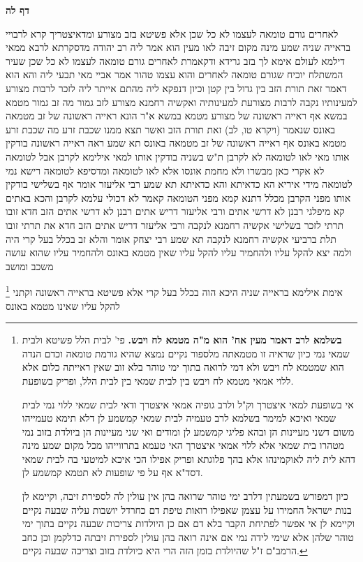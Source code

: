 \documentclass[12pt, openany]{book}
\newcommand{\sethebfont}{
\fontsize{10.5pt}{21.0pt} \selectfont
}
\newcommand{\twocol}[1]{
	{\sethebfont \begin{multicols}{2}
			#1
	\end{multicols}}	
}
\newcommand{\sectname}{}
\newcommand{\newsection}[1]{
	\addcontentsline{toc}{section}{#1}
	\renewcommand{\sectname}{#1}	
	\vspace{-\baselineskip}
	\begin{center}
		\textbf{%
\fontsize{16pt}{16pt}\selectfont
			#1}
	\end{center}
	\vspace{-\baselineskip}
	\nopagebreak
}
\newcommand{\footnotecomment}[1]{
	\renewcommand\thefootnote{}
	\footnote{#1}}
\newcommand{\commenta}[1]{\footnotecomment{#1}}
\begin{document}
\newsection{דף לה}
\twocol{לאחרים גורם טומאה לעצמו לא כל שכן אלא פשיטא בזב מצורע
ומדאיצטריך קרא לרבויי בראייה שניה שמע מינה מקום זיבה לאו מעין הוא 
אמר ליה רב יהודה מדסקרתא לרבא ממאי דילמא לעולם אימא לך בזב גרידא ודקאמרת לאחרים גורם טומאה לעצמו לא כל שכן שעיר המשתלח יוכיח שגורם טומאה לאחרים והוא עצמו טהור 
אמר אביי מאי תבעי ליה והא הוא דאמר זאת תורת הזב בין גדול בין קטן וכיון דנפקא ליה מהתם אייתר ליה לזכר לרבות מצורע למעינותיו נקבה לרבות מצורעת למעינותיה
ואקשיה רחמנא מצורע לזב גמור מה זב גמור מטמא במשא אף ראייה ראשונה של מצורע מטמא במשא 
א"ר הונא ראייה ראשונה של זב מטמאה באונס שנאמר (ויקרא טו, לב) זאת תורת הזב ואשר תצא ממנו שכבת זרע מה שכבת זרע מטמא באונס אף ראייה ראשונה של זב מטמאה באונס 
תא שמע ראה ראייה ראשונה בודקין אותו מאי לאו לטומאה לא לקרבן 
ת"ש בשניה בודקין אותו למאי אילימא לקרבן אבל לטומאה לא אקרי כאן מבשרו ולא מחמת אונסו אלא לאו לטומאה ומדסיפא לטומאה רישא נמי לטומאה 
מידי איריא הא כדאיתא והא כדאיתא 
תא שמע רבי אליעזר אומר אף בשלישי בודקין אותו מפני הקרבן מכלל דתנא קמא מפני הטומאה קאמר 
לא דכולי עלמא לקרבן והכא באתים קא מיפלגי רבנן לא דרשי אתים ורבי אליעזר דריש אתים 
רבנן לא דרשי אתים הזב חדא זובו תרתי לזכר בשלישי אקשיה רחמנא לנקבה 
ורבי אליעזר דריש אתים הזב חדא את תרתי זובו תלת ברביעי אקשיה רחמנא לנקבה 
תא שמע רבי יצחק אומר והלא זב בכלל בעל קרי היה ולמה יצא להקל עליו ולהחמיר עליו להקל עליו שאין מטמא באונס ולהחמיר עליו
שהוא עושה משכב ומושב 
\commenta{\textbf{בשלמא לרב דאמר מעין אח' הוא מ"ה מטמא לח ויבש.} פי' לבית הלל פשיטא ולבית שמאי נמי כיון שראיה זו מטמאתה מלספור נקיים נמצא שהיא גורמת טומאה וכדם הנדה הוא שמטמא לח ויבש ולא דמי לרואה בתוך ימי טוהר בלא זוב שאין ראייתה כלום אלא ללוי אמאי מטמא לח ויבש בין לבית שמאי בין לבית הלל, ופריק בשופעת.\par אי בשופעת למאי איצטרך וק"ל ולרב גופיה אמאי איצטרך ודאי לבית שמאי ללוי נמי לבית שמאי ואיכא למימר בשלמא לרב טעמיה לבית שמאי קמשמע לן דלא תימא טעמייהו משום דשני מעיינות הן ובהא פליגי קמשמע לן ומודים ואי שני מעיינות הן ביולדת בזוב נמי מטהרו בית שמאי אלא ללוי אמאי איצטרך האי טעמא בתרווייהו מכל מקום שמע מינה דהא לית ליה לאוקמינהו אלא בהך פלוגתא ופריק אפילו הכי איכא למיטעי בה לבית שמאי דסד"א אף על פי שופעות לא תטמא קמשמע לן.\par כיון דמפורש בשמעתין דלרב ימי טוהר שרואה בהן אין עולין לה לספירת זיבה, וקיימא לן בנות ישראל החמירו על עצמן שאפילו רואות טיפת דם כחרדל יושבות עליה שבעה נקיים וקיימא לן אי אפשר לפתיחת הקבר בלא דם אם כן היולדות צריכות שבעה נקיים בתוך ימי טוהר שלהן אלא שימי לידה נמי אם אינה רואה בהן עולין לספירת זיבתה כדלקמן וכן כחב הרמב"ם ז"ל שהיולדת בזמן הזה הרי היא כיולדת בזוב וצריכה שבעה נקיים. }
אימת אילימא בראייה שניה היכא הוה בכלל בעל קרי אלא פשיטא בראייה ראשונה וקתני להקל עליו שאינו מטמא באונס 
}
\end{document}

